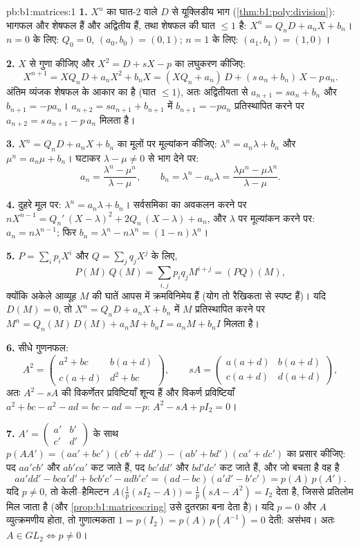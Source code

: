 \begin{solution}{pb:b1:matrices:1}
\textbf{1.} $X^n$ का घात-$2$ वाले  $D$ से यूक्लिडीय भाग
(\cref{thm:b1:poly:division}): भागफल और शेषफल हैं और अद्वितीय हैं, तथा शेषफल
की घात $\leq 1$ है: $X^n = Q_n D + a_n X + b_n$। $n = 0$ के लिए: $Q_0 = 0$,
$(a_0, b_0) = (0, 1)$; $n = 1$ के लिए: $(a_1, b_1) = (1, 0)$।

\textbf{2.} $X$ से गुणा कीजिए और $X^2 = D + sX - p$ का लघुकरण कीजिए:
\[
X^{n+1} = X Q_n D + a_n X^2 + b_n X
= (X Q_n + a_n)\,D + (s\,a_n + b_n)\,X - p\,a_n .
\]
अंतिम व्यंजक शेषफल के आकार का है (घात $\leq 1$), अतः अद्वितीयता से $a_{n+1}
= s a_n + b_n$ और $b_{n+1} = -p a_n$। $a_{n+2} = s a_{n+1} + b_{n+1}$ में
$b_{n+1} = -pa_n$ प्रतिस्थापित करने पर $a_{n+2} = s\,a_{n+1} - p\,a_n$ मिलता
है।

\textbf{3.} $X^n = Q_n D + a_n X + b_n$ का मूलों पर मूल्यांकन कीजिए:
$\lambda^n = a_n\lambda + b_n$ और $\mu^n = a_n\mu + b_n$। घटाकर $\lambda -
\mu \neq 0$ से भाग देने पर:
\[
a_n = \frac{\lambda^n - \mu^n}{\lambda - \mu},
\qquad
b_n = \lambda^n - a_n\lambda
= \frac{\lambda\mu^n - \mu\lambda^n}{\lambda - \mu} .
\]

\textbf{4.} दुहरे मूल पर: $\lambda^n = a_n\lambda + b_n$। सर्वसमिका का अवकलन
करने पर $nX^{n-1} = Q_n'\,(X - \lambda)^2 + 2Q_n\,(X - \lambda) + a_n$, और
$\lambda$ पर मूल्यांकन करने पर: $a_n = n\lambda^{n-1}$; फिर $b_n = \lambda^n
- n\lambda^{n} = (1 - n)\lambda^{n}$।

\textbf{5.} $P = \sum_i p_i X^i$ और $Q = \sum_j q_j X^j$ के लिए,
\[
P(M)\,Q(M) = \sum_{i,j} p_i q_j M^{i+j} = (PQ)(M),
\]
क्योंकि अकेले आव्यूह $M$ की घातें आपस में क्रमविनिमेय हैं (योग तो रैखिकता से
स्पष्ट हैं)। यदि $D(M) = 0$, तो $X^n = Q_n D + a_n X + b_n$ में $M$
प्रतिस्थापित करने पर $M^n = Q_n(M)\,D(M) + a_n M + b_n I = a_n M + b_n I$
मिलता है।

\textbf{6.} सीधे गुणनफल:
\[
A^2 = \begin{pmatrix}
a^2 + bc & b(a + d)\\
c(a + d) & d^2 + bc
\end{pmatrix},
\qquad
s A = \begin{pmatrix}
a(a+d) & b(a+d)\\
c(a+d) & d(a+d)
\end{pmatrix},
\]
अतः $A^2 - sA$ की विकर्णेतर प्रविष्टियाँ शून्य हैं और विकर्ण प्रविष्टियाँ
$a^2 + bc - a^2 - ad = bc - ad = -p$: $A^2 - sA + pI_2 = 0$।

\textbf{7.} $A' = \begin{pmatrix} a' & b'\\ c' & d'\end{pmatrix}$ के साथ
$p(AA') = (aa' + bc')(cb' + dd') - (ab' + bd')(ca' + dc')$ का प्रसार कीजिए:
पद $aa'cb'$ और $ab'ca'$ कट जाते हैं, पद $bc'dd'$ और $bd'dc'$ कट जाते हैं, और
जो बचता है वह है
\[
aa'dd' - bca'd' + bcb'c' - adb'c'
= (ad - bc)(a'd' - b'c') = p(A)\,p(A').
\]
यदि $p \neq 0$, तो केली--हैमिल्टन $A\,\bigl(\tfrac1p(sI_2 - A)\bigr) =
\tfrac1p(sA - A^2) = I_2$ देता है, जिससे प्रतिलोम मिल जाता है (और
\cref{prop:b1:matrices:ring} उसे दुतरफ़ा बना देता है)। यदि $p = 0$ और $A$
व्युत्क्रमणीय होता, तो गुणात्मकता $1 = p(I_2) = p(A)\,p(A^{-1}) = 0$ देती:
असंभव। अतः $A \in GL_2 \iff p \neq 0$।


\end{solution}
